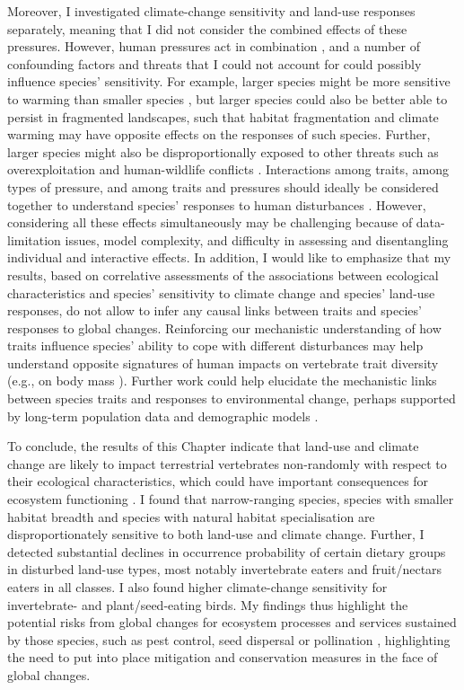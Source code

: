 Moreover, I investigated climate-change sensitivity and land-use responses separately, meaning that I did not consider the combined effects of these pressures. However, human pressures act in combination \citep{Segan2016, Harfoot2021, Capdevila2022b}, and a number of confounding factors and threats that I could not account for could possibly influence species' sensitivity. For example, larger species might be more sensitive to warming than smaller species \citep{Merckx2018, Hantak2021}, but larger species could also be better able to persist in fragmented landscapes, such that habitat fragmentation and climate warming may have opposite effects on the responses of such species. Further, larger species might also be disproportionally exposed to other threats such as overexploitation and human-wildlife conflicts \citep{Ripple2014, Ripple2017}. Interactions among traits, among types of pressure, and among traits and pressures should ideally be considered together to understand species' responses to human disturbances \citep{Hantak2021}. However, considering all these effects simultaneously may be challenging because of data-limitation issues, model complexity, and difficulty in assessing and disentangling individual and interactive effects. In addition, I would like to emphasize that my results, based on correlative assessments of the associations between ecological characteristics and species' sensitivity to climate change and species' land-use responses, do not allow to infer any causal links between traits and species' responses to global changes. Reinforcing our mechanistic understanding of how traits influence species' ability to cope with different disturbances may help understand opposite signatures of human impacts on vertebrate trait diversity (e.g., on body mass \citep{Merckx2018, Hantak2021, Ripple2014, Ripple2017, Rapacciuolo2017}). Further work could help elucidate the mechanistic links between species traits and responses to environmental change, perhaps supported by long-term population data and demographic models \citep{HernandezYanez2022}.

To conclude, the results of this Chapter indicate that land-use and climate change are likely to impact terrestrial vertebrates non-randomly with respect to their ecological characteristics, which could have important consequences for ecosystem functioning \citep{Duffy2003, Luck2012}. I found that narrow-ranging species, species with smaller habitat breadth and species with natural habitat specialisation are disproportionately sensitive to both land-use and climate change. Further, I detected substantial declines in occurrence probability of certain dietary groups in disturbed land-use types, most notably invertebrate eaters and fruit/nectars eaters in all classes. I also found higher climate-change sensitivity for invertebrate- and plant/seed-eating birds. My findings thus highlight the potential risks from global changes for ecosystem processes and services sustained by those species, such as pest control, seed dispersal or pollination \citep{Civantos2012, GonzalezVaro2013, Fricke2022}, highlighting the need to put into place mitigation and conservation measures in the face of global changes. 
